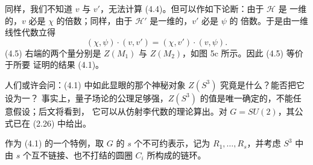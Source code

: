 \documentclass[11pt,a4paper]{article}
\begin{document}
同样，我们不知道 $v$ 与 $v'$，无法计算 (4.4)。但可以作如下论断：由于 $\mathcal{H}$ 是
一维的，$v$ 必是 $\chi$ 的倍数；同样，由于 $\mathcal{H}'$ 是一维的，$v'$ 必是 $\psi$ 的
倍数。于是由一维线性代数立得
\begin{equation}
    (\chi,\psi)\cdot(v,v')=(\chi,v')\cdot(v,\psi).
    \tag{4.5}
\end{equation}
(4.5) 右端的两个量分别是 $Z(M_1)$ 与 $Z(M_2)$，如图 5c 所示。因此 (4.5) 等价于所要
证明的结果 (4.1)。


人们或许会问：(4.1) 中如此显眼的那个神秘对象 $Z(S^3)$ 究竟是什么？能否把它设为一？
事实上，量子场论的公理足够强，$Z(S^3)$ 的值是唯一确定的，不能任意假设；后文将看到，
它可以从仿射李代数的理论算出。对 $G=SU(2)$，其公式已在 (2.26) 中给出。


作为 (4.1) 的一个特例，取 $G$ 的 $s$ 个不可约表示，记为 $R_1,\ldots,R_s$，并考虑 $S^3$
中由 $s$ 个互不链接、也不打结的圆圈 $C_i$ 所构成的链环。



\end{document}
